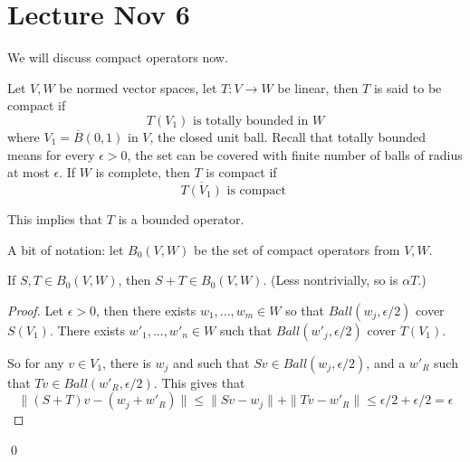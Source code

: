 \section{Lecture Nov 6}
We will discuss compact operators now.
\begin{definition}
    Let $V, W$ be normed vector spaces, let $T: V\to W$ be linear, then $T$ is said to be compact if
    \begin{equation*}
        T(V_1) \text{ is totally bounded in } W
    \end{equation*}
    where $V_1=\overline{B}(0,1)$ in $V$, the closed unit ball. Recall that totally bounded means for every $\epsilon>0$, the set can be covered with finite number of balls of radius at most $\epsilon$. If $W$ is complete, then $T$ is compact if
    \begin{equation*}
        \overline{T(V_1)} \text{ is compact }
    \end{equation*}
\end{definition}
\begin{note}
    This implies that $T$ is a bounded operator.
\end{note}

A bit of notation: let $B_0(V,W)$ be the set of compact operators from $V,W$.
\begin{proposition}
    If $S,T\in B_0(V,W)$, then $S+T\in B_0(V,W)$. (Less nontrivially, so is $\alpha T$.)
\end{proposition}
\begin{proof}
    Let $\epsilon>0$, then there exists $w_1, ..., w_m\in W$ so that $Ball( w_j, \epsilon/2)$ cover $S(V_1)$. There exists $w'_1, ..., w'_n\in W$ such that $Ball(w'_j, \epsilon/2)$ cover $T(V_1)$.

    So for any $v\in V_1$, there is $w_j$ and such that $Sv\in Ball(w_j, \epsilon/2)$, and a $w'_R$ such that $Tv\in Ball(w'_R, \epsilon/2)$. This gives that 
    \begin{equation*}
        \|(S+T)v-(w_j+w'_R)\|\leq \|Sv-w_j\|+\|Tv-w'_R\|\leq\epsilon/2+\epsilon/2=\epsilon
    \end{equation*}
\end{proof}
\qed

